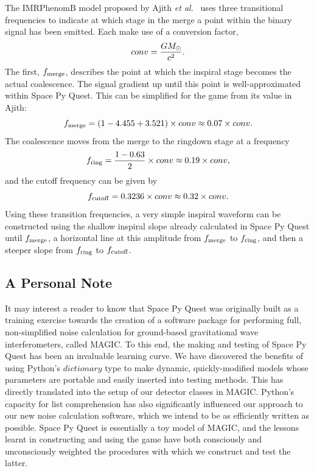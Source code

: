 \documentclass{article}
\begin{document}
\begin{enumerate}
The IMRPhenomB model proposed by Ajith \textit{et al.}~\cite{ajith}
uses three transitional frequencies to indicate at which stage in the
merge a point within the binary signal has been emitted. Each make use
of a conversion factor,
\begin{equation}
conv = \frac{GM_{\rm \odot}}{c^2}.
\end{equation}
The first, $f_{\rm merge}$, describes the point at which the inspiral
stage becomes the actual coalescence. The signal gradient up until
this point is well-approximated within Space Py Quest. This can be
simplified for the game from its value in Ajith:
\begin{equation}
f_{\rm merge} = (1 - 4.455 + 3.521) \times conv \approx 0.07 \times conv .
\end{equation}
The coalescence moves from the merge to the ringdown stage at a frequency
\begin{equation}
f_{\rm ring} = \frac{1 - 0.63}{2} \times conv \approx 0.19 \times conv,
\end{equation}
and the cutoff frequency can be given by
\begin{equation}
f_{\rm cutoff} = 0.3236 \times conv \approx 0.32 \times conv.
\end{equation}
Using these transition frequencies, a very simple inspiral waveform
can be constructed using the shallow inspiral slope already calculated
in Space Py Quest until $f_{\rm \rm merge}$, a horizontal line at this
amplitude from $f_{\rm merge}$ to $f_{\rm ring}$, and then a steeper slope
from $f_{\rm ring}$ to $f_{\rm cutoff}$. 
\end{enumerate}

\subsection{A Personal Note}
It may interest a reader to know that Space Py Quest was originally
built as a training exercise towards the creation of a software
package for performing full, non-simplified noise calculation for
ground-based gravitational wave interferometers, called MAGIC. To this
end, the making and testing of Space Py Quest has been an invaluable
learning curve. We have discovered the benefits of using Python's
$dictionary$ type to make dynamic, quickly-modified models whose
parameters are portable and easily inserted into testing methods. This
has directly translated into the setup of our detector classes in
MAGIC. Python's capacity for list comprehension has also significantly
influenced our approach to our new noise calculation software, which
we intend to be as efficiently written as possible. Space Py Quest is
essentially a toy model of MAGIC, and the lessons learnt in
constructing and using the game have both consciously and
unconsciously weighted the procedures with which we construct and test
the latter.
\end{document}
